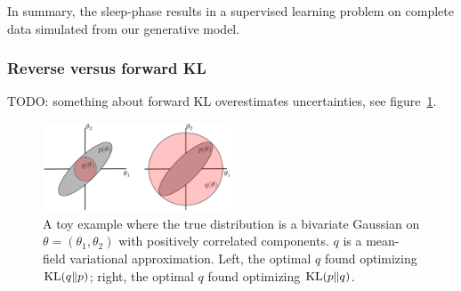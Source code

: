 In summary, the sleep-phase results in a supervised learning problem on complete data simulated from our generative model. 

\subsubsection{Reverse versus forward KL}
\label{sec:kl_q_p}
TODO: something about forward KL overestimates uncertainties, see figure~\ref{fig:kl_q_p_schematic}. 

\begin{figure}[!h]
    \centering
    \includegraphics[width = 0.5\textwidth]{figures/kl_q_p_schematic.png}
    \caption{A toy example where the true distribution is a bivariate Gaussian on 
    $\theta = (\theta_1, \theta_2)$ with positively correlated components. 
    $q$ is a mean-field variational approximation. Left, the optimal $q$ found 
    optimizing $\textrm{KL}(q\|p)$; right, the optimal $q$ found optimizing $\textrm{KL}(p\|q)$. }
    \label{fig:kl_q_p_schematic}
\end{figure}

